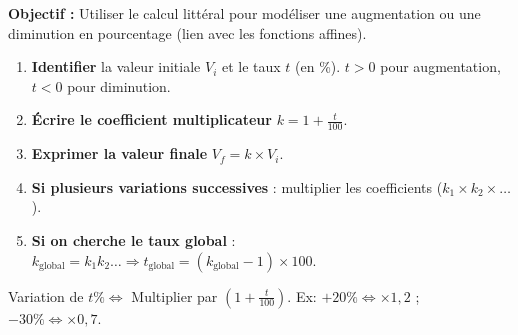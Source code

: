 \documentclass[11pt]{article}
\begin{document}
\begin{methode}
    \textbf{Objectif :} Utiliser le calcul littéral pour modéliser une augmentation ou une diminution en pourcentage (lien avec les fonctions affines).
    \begin{enumerate}
        \item \textbf{Identifier} la valeur initiale $V_i$ et le taux $t$ (en \%). $t > 0$ pour augmentation, $t < 0$ pour diminution.
        \item \textbf{Écrire le coefficient multiplicateur} $k = 1 + \frac{t}{100}$.
        \item \textbf{Exprimer la valeur finale} $V_f = k \times V_i$.
        \item \textbf{Si plusieurs variations successives} : multiplier les coefficients ($k_1 \times k_2 \times \dots$).
        \item \textbf{Si on cherche le taux global} : $k_{\text{global}} = k_1 k_2 \dots \Rightarrow t_{\text{global}} = (k_{\text{global}} - 1) \times 100$.
    \end{enumerate}
    \begin{aretenir} Variation de $t\% \iff$ Multiplier par $\left(1 + \frac{t}{100}\right)$.
    Ex: $+20\% \iff \times 1,2$ ; $-30\% \iff \times 0,7$.
    \end{aretenir}
\end{methode}
\end{document}
